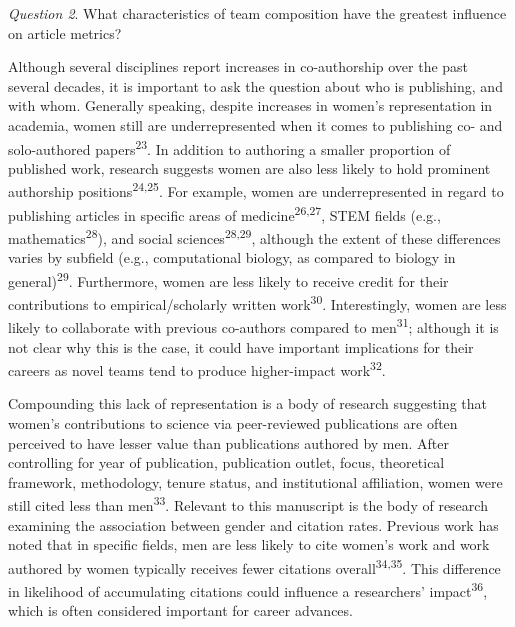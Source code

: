 \documentclass[
  man,floatsintext]{apa6}
\begin{document}
\emph{Question 2}. What characteristics of team composition have the greatest influence on article metrics?

Although several disciplines report increases in co-authorship over the past several decades, it is important to ask the question about who is publishing, and with whom. Generally speaking, despite increases in women's representation in academia, women still are underrepresented when it comes to publishing co- and solo-authored papers\textsuperscript{23}. In addition to authoring a smaller proportion of published work, research suggests women are also less likely to hold prominent authorship positions\textsuperscript{24,25}. For example, women are underrepresented in regard to publishing articles in specific areas of medicine\textsuperscript{26,27}, STEM fields (e.g., mathematics\textsuperscript{28}), and social sciences\textsuperscript{28,29}, although the extent of these differences varies by subfield (e.g., computational biology, as compared to biology in general)\textsuperscript{29}. Furthermore, women are less likely to receive credit for their contributions to empirical/scholarly written work\textsuperscript{30}. Interestingly, women are less likely to collaborate with previous co-authors compared to men\textsuperscript{31}; although it is not clear why this is the case, it could have important implications for their careers as novel teams tend to produce higher-impact work\textsuperscript{32}.

Compounding this lack of representation is a body of research suggesting that women's contributions to science via peer-reviewed publications are often perceived to have lesser value than publications authored by men. After controlling for year of publication, publication outlet, focus, theoretical framework, methodology, tenure status, and institutional affiliation, women were still cited less than men\textsuperscript{33}. Relevant to this manuscript is the body of research examining the association between gender and citation rates. Previous work has noted that in specific fields, men are less likely to cite women's work and work authored by women typically receives fewer citations overall\textsuperscript{34,35}. This difference in likelihood of accumulating citations could influence a researchers' impact\textsuperscript{36}, which is often considered important for career advances.
\end{document}
